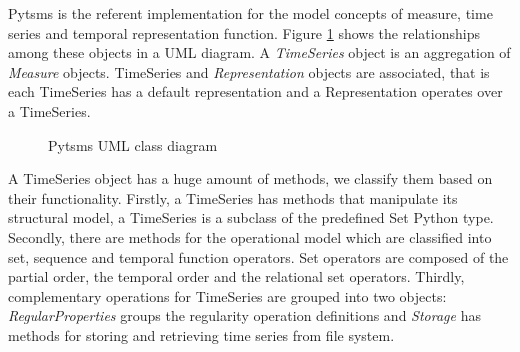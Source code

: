 Pytsms is the referent implementation for the model concepts of
measure, time series and temporal representation function.  Figure
\ref{fig:implementacio:pytsms-uml} shows the relationships among these
objects in a UML diagram. A \emph{TimeSeries} object is an aggregation
of \emph{Measure} objects. TimeSeries and \emph{Representation}
objects are associated, that is each TimeSeries has a default
representation and a Representation operates over a TimeSeries.

\begin{figure}[tp]
  \centering



  \caption{Pytsms UML class diagram}
  \label{fig:implementacio:pytsms-uml}
\end{figure}




A TimeSeries object has a huge amount of methods, we classify them
based on their functionality. Firstly, a TimeSeries has methods that
manipulate its structural model, a TimeSeries is a subclass of the
predefined Set Python type. Secondly, there are methods for the
operational model which are classified into set, sequence and temporal
function operators.  Set operators are composed of the partial order,
the temporal order and the relational set operators.  Thirdly,
complementary operations for TimeSeries are grouped into two objects:
\emph{RegularProperties} groups the regularity operation definitions
and \emph{Storage} has methods for storing and retrieving time series
from file system.


